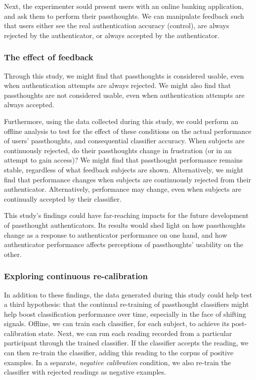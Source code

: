 \documentclass[sigconf]{acmart}
\begin{document}
Next, the experimenter sould present users with an online banking application, and ask them to perform their passthoughts.
We can manipulate feedback such that users either see the real authentication accuracy (control), 
are always rejected by the authenticator, 
or always accepted by the authenticator.

\subsubsection{The effect of feedback}
\label{sec:orgc529a54}

Through this study, we might find 
that passthoughts is considered usable, even when authentication attempts are always rejected.
We might also find that passthoughts are not considered usable, 
even when authentication attempts are always accepted.

Furthermore, using the data collected during this study, we could perform an offline analysis 
to test for the effect of these conditions on the actual performance of users' passthoughts, and consequential classifier accuracy.
When subjects are continuously rejected, do their passthoughts change in frustration (or in an attempt to gain access)?
We might find that passthought performance 
remains stable, regardless of what feedback subjects are shown.
Alternatively, we might find that performance changes 
when subjects are continuously rejected from their authenticator.
Alternatively, performance may change, 
even when subjects are continually accepted by their classifier.

This study's findings could have far-reaching impacts for the future development of passthought authenticators.
Its results would shed light on how passthoughts change as a response to authenticator performance on one hand,
and how authenticator performance affects perceptions of passthoughts' usability on the other.

\subsubsection{Exploring continuous re-calibration}
\label{sec:org6714417}

In addition to these findings, the data generated during this study could help test 
a third hypothesis: that the continual re-training of passthought classifiers might help boost classification performance over time,
especially in the face of shifting signals.
Offline, we can train each classifier, for each subject, to achieve its post-calibration state.
Next, we can run each reading recorded from a particular participant through the trained classifier.
If the classifier accepts the reading, we can then re-train the classifier, 
adding this reading to the corpus of positive examples.
In a separate, \emph{negative calibration} condition, 
we also re-train the classifier with rejected readings as negative examples.
\end{document}
